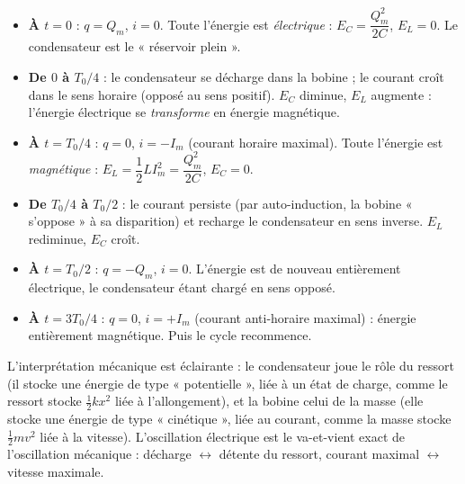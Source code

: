 \documentclass[11pt]{article}
\newcommand{\cle}[1]{{\popxbold\color{popdark}#1}}
\begin{document}
\begin{itemize}
\item \textbf{À $t = 0$} : $q = Q_m$, $i = 0$. Toute l'énergie est \emph{électrique} : $E_C = \dfrac{Q_m^2}{2C}$, $E_L = 0$. Le condensateur est le « réservoir plein ».
\item \textbf{De $0$ à $T_0/4$} : le condensateur se décharge dans la bobine ; le courant croît dans le sens horaire (opposé au sens positif). $E_C$ diminue, $E_L$ augmente : l'énergie électrique se \emph{transforme} en énergie magnétique.
\item \textbf{À $t = T_0/4$} : $q = 0$, $i = -I_m$ (courant horaire maximal). Toute l'énergie est \emph{magnétique} : $E_L = \dfrac{1}{2}LI_m^2 = \dfrac{Q_m^2}{2C}$, $E_C = 0$.
\item \textbf{De $T_0/4$ à $T_0/2$} : le courant persiste (par auto-induction, la bobine « s'oppose » à sa disparition) et recharge le condensateur en sens inverse. $E_L$ rediminue, $E_C$ croît.
\item \textbf{À $t = T_0/2$} : $q = -Q_m$, $i = 0$. L'énergie est de nouveau entièrement électrique, le condensateur étant chargé en sens opposé.
\item \textbf{À $t = 3T_0/4$} : $q = 0$, $i = +I_m$ (courant anti-horaire maximal) : énergie entièrement magnétique. Puis le cycle recommence.
\end{itemize}

L'interprétation mécanique est éclairante : le condensateur joue le rôle du \cle{ressort} (il stocke une énergie de type « potentielle », liée à un état de charge, comme le ressort stocke $\frac{1}{2}kx^2$ liée à l'allongement), et la bobine celui de la \cle{masse} (elle stocke une énergie de type « cinétique », liée au courant, comme la masse stocke $\frac{1}{2}mv^2$ liée à la vitesse). L'oscillation électrique est le va-et-vient exact de l'oscillation mécanique : décharge $\leftrightarrow$ détente du ressort, courant maximal $\leftrightarrow$ vitesse maximale.
\end{document}
